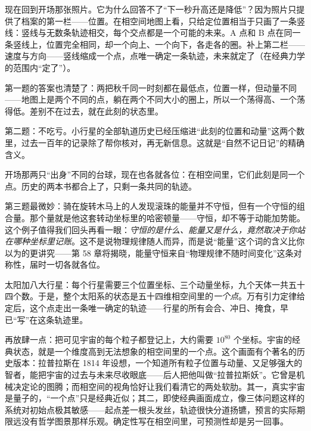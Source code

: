 \begin{center}
\end{center}


现在回到开场那张照片。它为什么回答不了“下一秒升高还是降低”？因为照片只提供了档案的第一栏——位置。在相空间地图上看，只给定位置相当于只画了一条竖线：竖线与无数条轨迹相交，每个交点都是一个可能的未来。A 点和 B 点在同一条竖线上，位置完全相同，却一个向上、一个向下，各走各的圈。补上第二栏——速度与方向——竖线缩成一个点，点唯一确定一条轨迹，未来就定了（在经典力学的范围内“定了”）。

第一题的答案也清楚了：两把秋千同一时刻都在最低点，位置一样，但动量不同——地图上是两个不同的点，躺在两个不同大小的圈上，所以一个荡得高、一个荡得低。差别不在过去，就在此刻的状态里。

第二题：不吃亏。小行星的全部轨道历史已经压缩进“此刻的位置和动量”这两个数里，过去一百年的记录除了帮你核对，再无新信息。这就是“自然不记日记”的精确含义。

开场那两只“出身”不同的台球，现在也各就各位：在相空间里，它们此刻是同一个点。历史的两本书都合上了，只剩一条共同的轨迹。

第三题最微妙：骑在旋转木马上的人发现滚珠的能量并不守恒，但有一个守恒的组合量。那个量就是他这套转动坐标里的哈密顿量——守恒，却不等于动能加势能。这个例子值得我们回头再看一眼：\emph{守恒的是什么、能量又是什么，竟然取决于你站在哪种坐标里记账}。这不是说物理规律随人而异，而是说“能量”这个词的含义比你以为的更讲究——第 58 章将揭晓，能量守恒来自“物理规律不随时间变化”这条对称性，届时一切各就各位。


\begin{thought}[把太阳系装进一个点]
太阳加八大行星：每个行星需要三个位置坐标、三个动量坐标，九个天体一共五十四个数。于是，整个太阳系的状态是五十四维相空间里的\emph{一个点}。万有引力定律给定后，这个点走出一条唯一确定的轨迹——行星的所有会合、冲日、掩食，早已“写”在这条轨迹里。

再放肆一点：把可见宇宙的每个粒子都登记上，大约需要 \(10^{80}\) 个坐标。宇宙的经典状态，就是一个维度高到无法想象的相空间里的一个点。这个画面有个著名的历史版本：拉普拉斯在 1814 年设想，一个知道所有粒子位置与动量、又足够强大的智者，能把宇宙的过去与未来尽收眼底——后人把他叫做“拉普拉斯妖”。它曾是机械决定论的图腾；而相空间的视角恰好让我们看清它的两处软肋。其一，真实宇宙是量子的，“一个点”只是经典近似；其二，即使经典画面成立，像三体问题这样的系统对初始点极其敏感——起点差一根头发丝，轨迹很快分道扬镳，预言的实际期限远没有哲学图景那样乐观。确定性写在相空间里，可预测性却是另一回事。
\end{thought}

